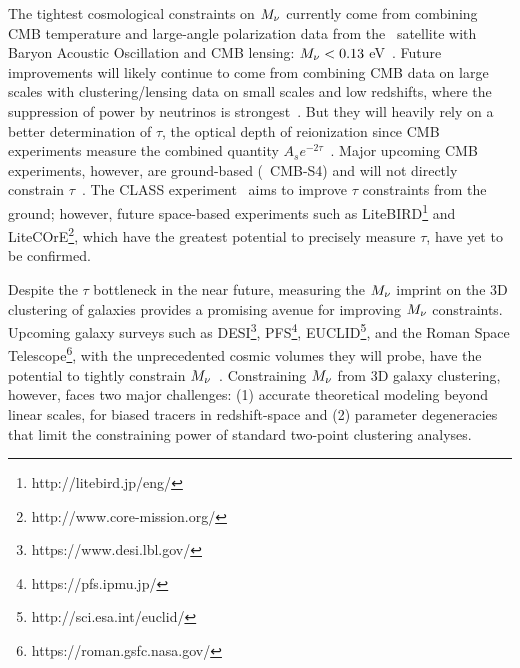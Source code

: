 The tightest cosmological constraints on $M_\nu$ currently come from 
combining CMB temperature and large-angle polarization data from the 
\planck~satellite with Baryon Acoustic Oscillation and CMB lensing: 
$M_\nu < 0.13$ eV~\citep{planckcollaboration2018}. Future improvements
will likely continue to come from combining CMB data on large scales 
with clustering/lensing data on small scales and low redshifts, where 
the suppression of power by neutrinos is strongest~\citep{brinckmann2019}. 
But they will heavily rely on a better determination of $\tau$, the optical
depth of reionization since CMB experiments measure the combined quantity $A_s
e^{-2\tau}$~\citep{allison2015, liu2016, archidiacono2017}.
Major upcoming CMB experiments, however, are ground-based (\eg~CMB-S4) and 
will not directly constrain $\tau$~\citep{abazajian2016}. The CLASS
experiment~\citep{xu2020} aims to improve $\tau$ constraints from the ground;
however, future space-based experiments such as LiteBIRD\footnote{http://litebird.jp/eng/} 
and LiteCOrE\footnote{http://www.core-mission.org/}, which have the greatest 
potential to precisely measure $\tau$, have yet to be confirmed. 

Despite the $\tau$ bottleneck in the near future, measuring the $M_\nu$ imprint 
on the 3D clustering of galaxies provides a promising avenue for improving $M_\nu$ constraints. 
Upcoming galaxy surveys such as DESI\footnote{https://www.desi.lbl.gov/}, 
PFS\footnote{https://pfs.ipmu.jp/}, EUCLID\footnote{http://sci.esa.int/euclid/}, 
and the Roman Space Telescope\footnote{https://roman.gsfc.nasa.gov/}, 
with the unprecedented cosmic volumes they will probe, 
have the potential to tightly constrain 
$M_\nu$~\citep{audren2013, font-ribera2014, petracca2016, sartoris2016, boyle2018}.
Constraining $M_\nu$ from 3D galaxy clustering, however, faces two major 
challenges: (1) accurate theoretical modeling beyond linear scales, for biased
tracers in redshift-space and (2) parameter degeneracies that limit the
constraining power of standard two-point clustering analyses. 

